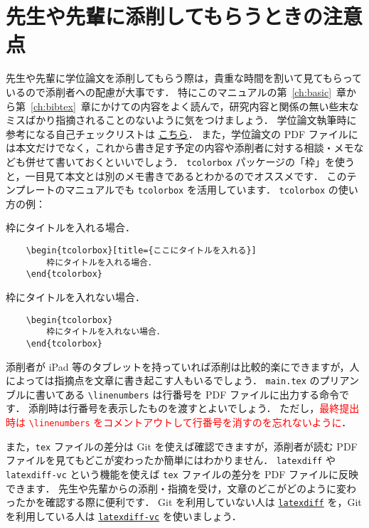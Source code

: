 \chapter{先生や先輩に添削してもらうときの注意点}
\label{ch:check}

先生や先輩に学位論文を添削してもらう際は，貴重な時間を割いて見てもらっているので添削者への配慮が大事です．
特にこのマニュアルの第~\ref{ch:basic}~章から第~\ref{ch:bibtex}~章にかけての内容をよく読んで，研究内容と関係の無い些末なミスばかり指摘されることのないように気をつけましょう．
学位論文執筆時に参考になる自己チェックリストは \href{https://github.com/ryo-ARAKI/thesis_template_ou_es/blob/master/self_checklist.md}{こちら}．
また，学位論文の PDF ファイルには本文だけでなく，これから書き足す予定の内容や添削者に対する相談・メモなども併せて書いておくといいでしょう．
\verb|tcolorbox| パッケージの「枠」を使うと，一目見て本文とは別のメモ書きであるとわかるのでオススメです．
このテンプレートのマニュアルでも \verb|tcolorbox| を活用しています．
\verb|tcolorbox| の使い方の例：
\begin{tcolorbox}[title={ここにタイトルを入れる}]
    枠にタイトルを入れる場合．
    \tcblower
\begin{verbatim}
    \begin{tcolorbox}[title={ここにタイトルを入れる}]
        枠にタイトルを入れる場合．
    \end{tcolorbox}
\end{verbatim}
\end{tcolorbox}

\begin{tcolorbox}
    枠にタイトルを入れない場合．
    \tcblower
\begin{verbatim}
    \begin{tcolorbox}
        枠にタイトルを入れない場合．
    \end{tcolorbox}
\end{verbatim}
\end{tcolorbox}

添削者が iPad 等のタブレットを持っていれば添削は比較的楽にできますが，人によっては指摘点を文章に書き起こす人もいるでしょう．
\verb|main.tex| のプリアンブルに書いてある \verb|\linenumbers| は行番号を PDF ファイルに出力する命令です．
添削時は行番号を表示したものを渡すとよいでしょう．
ただし，\textcolor{red}{最終提出時は \texttt{\textbackslash linenumbers} をコメントアウトして行番号を消すのを忘れないように}．

また，\verb|tex| ファイルの差分は Git を使えば確認できますが，添削者が読む PDF ファイルを見てもどこが変わったか簡単にはわかりません．
\verb|latexdiff| や \verb|latexdiff-vc| という機能を使えば \verb|tex| ファイルの差分を PDF ファイルに反映できます．
先生や先輩からの添削・指摘を受け，文章のどこがどのように変わったかを確認する際に便利です．
Git を利用していない人は \hyperref[sec:latexdiff]{\texttt{latexdiff}} を，Git を利用している人は \hyperref[sec:latexdiff-vc]{\texttt{latexdiff-vc}} を使いましょう．

